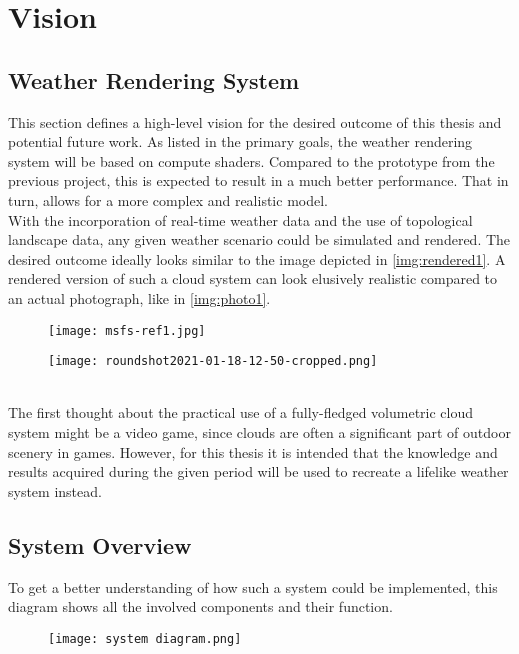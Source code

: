 \section{Vision}

\subsection{Weather Rendering System}
This section defines a high-level vision for the desired outcome of this thesis and potential future work.
As listed in the primary goals, the weather rendering system will be based on compute shaders.
Compared to the prototype from the previous project, this is expected to result in a much better performance.
That in turn, allows for a more complex and realistic model.
\\
With the incorporation of real-time weather data and the use of topological landscape data, any given weather scenario could be simulated and rendered.
The desired outcome ideally looks similar to the image depicted in \autoref{img:rendered1}.
A rendered version of such a cloud system can look elusively realistic compared to an actual photograph, like in \autoref{img:photo1}.
\begin{figure}[ht]
    \centering
        \begin{minipage}{0.47\linewidth}
            \texttt{[image: msfs-ref1.jpg]}
            \label{img:rendered1}
        \end{minipage}
    \hfill
        \begin{minipage}{0.47\linewidth}
            \texttt{[image: roundshot2021-01-18-12-50-cropped.png]}
            \label{img:photo1}        
        \end{minipage}  
\end{figure}
\\
The first thought about the practical use of a fully-fledged volumetric cloud system might be a video game, since clouds are often a significant part of outdoor scenery in games.
However, for this thesis it is intended that the knowledge and results acquired during the given period will be used to recreate a lifelike weather system instead.

\clearpage

\subsection{System Overview}
To get a better understanding of how such a system could be implemented, this diagram shows all the involved components and their function.
\begin{figure}[H]
    \centering
    \texttt{[image: system diagram.png]}
    \label{img:systemoverview}
\end{figure}


